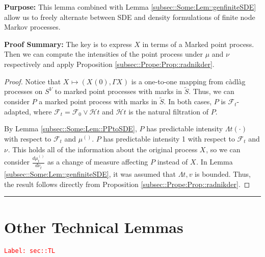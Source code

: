 \documentclass[12pt]{article}
\newcommand{\mc}{\mathcal}
\newcommand{\tr}{\textcolor{red}}
\newcommand{\labe}[1]{\tr{\texttt{Label: #1}}}
\newcommand{\purpose}{\textbf{Purpose: }}
\newcommand{\pfsum}{\textbf{Proof Summary: }}
\newcommand{\ind}{\hspace{24pt}}
\newcommand{\lin}{\rule{\linewidth}{0.4 pt}}
\renewcommand{\v}{v}							%
\renewcommand{\S}{S}							%
\renewcommand{\t}{t}							%
\newcommand{\F}{\mc{F}}							%
\newcommand{\FH}{\mc{H}}						%
\newcommand{\X}{X}								%
\newcommand{\vind}[1]{^{#1}}					%
\newcommand{\carp}[1]{^{#1}}					%
\newcommand{\vsi}[1]{^{#1}}						%
\newcommand{\cind}[1]{_{#1}}					%
\newcommand{\tp}[1]{(#1)}						%
\newcommand{\tip}[1]{#1}						%
\newcommand{\ts}[1]{_{#1}}						%
\newcommand{\sln}[1]{^{(#1)}}						%
\newcommand{\alt}[1]{\widetilde{#1}}			%
\newcommand{\m}{\mu}							%
\newcommand{\mm}{\nu}							%
\newcommand{\pmap}{\Gamma}						%
\newcommand{\rp}{P}								%
\newcommand{\ratee}{\Lambda}					%
\begin{document}
\purpose This lemma combined with Lemma \ref{subsec::Some:Lem::genfiniteSDE} allow us to freely alternate between SDE and density formulations of finite node Markov processes.

\pfsum The key is to express \(\X\) in terms of a Marked point process. Then we can compute the intensities of the point process under \(\m\) and \(\mm\) respectively and apply Proposition \ref{subsec::Prope:Prop::radnikder}.

\begin{proof}
Notice that \(\X\cind{}\tip{} \mapsto (\X\cind{}\tp{0},\pmap{\X\cind{}\tip{}})\) is a one-to-one mapping from c\`adl\`ag processes on \(\S\carp{V}\) to marked point processes with marks in \(\alt{\S}\). Thus, we can consider \(\rp{}\) a marked point process with marks in \(\alt{\S}\). In both cases, \(\rp{}\) is \(\F\vsi{}\ts{\t}\)-adapted, where \(\F\vsi{}\ts{\t} = \F\vsi{}\ts{0}\vee \FH{}{\t}\) and \(\FH{}{\t}\) is the natural filtration of \(\rp{}\).

\ind By Lemma \ref{subsec::Some:Lem::PPtoSDE}, \(\rp{}\) has predictable intensity \(\ratee{\t}(\cdot)\) with respect to \(\F\vsi{}\ts{\t}\) and \(\m\sln{}\ts{}\). \(\rp{}\) has predictable intensity 1 with respect to \(\F\vsi{}\ts{\t}\) and \(\mm\vind{}\ts{}\). This holds all of the information about the original process \(\X\cind{}\tip{}\), so we can consider \(\frac{d\m\sln{}\ts{\t}}{d\mm\vind{}\ts{\t}}\) as a change of measure affecting \(\rp{}\) instead of \(\X\cind{}\tip{}\). In Lemma \ref{subsec::Some:Lem::genfiniteSDE}, it was assumed that \(\ratee{\t,\v}\) is bounded. Thus, the result follows directly from Proposition \ref{subsec::Prope:Prop::radnikder}. 
\end{proof}

\lin
\section{Other Technical Lemmas}
\label{sec::TL}\labe{sec::TL}
\end{document}
